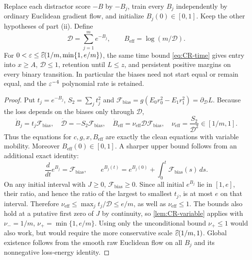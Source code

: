 \begin{corollary}
\label{cor:CR-independent}
Replace each distractor score $-B$ by $-B_j$, train every $B_j$ independently by ordinary Euclidean gradient flow,
and initialize $B_j(0)\in[0,1]$. Keep the other hypotheses of part (ii).
Define
\[
 \mathcal D=\sum_{j=1}^m e^{-B_j},\qquad B_{\mathrm{eff}}=\log(m/\mathcal D).
\]
For $0<\varepsilon\le\widehat{\varepsilon}(1/m,\min\{1,e/m\})$, the same time bound \cref{eq:CR-time} gives
entry into $x\ge A$, $\mathcal D\le1$, retention until $L\le z$, and persistent positive margins on every binary transition.
In particular the biases need not start equal or remain equal, and the $\varepsilon^{-4}$ polynomial rate is retained.
\end{corollary}
\begin{proof}
Put $t_j=e^{-B_j}$, $S_2=\sum_jt_j^2$ and
$\mathcal F_{\mathrm{bias}}=g(E_0r_0^2-E_1r_1^2)=\partial_{\mathcal D} L$.
Because the loss depends on the biases only through $\mathcal D$,
\begin{equation}
 \dot B_j=t_j\mathcal F_{\mathrm{bias}},\quad \dot{\mathcal D}=-S_2\mathcal F_{\mathrm{bias}},\quad
 \dot B_{\mathrm{eff}}=\nu_{\mathrm{eff}}\mathcal D\mathcal F_{\mathrm{bias}},\quad
 \nu_{\mathrm{eff}}=\frac{S_2}{\mathcal D^2}\in[1/m,1].
 \label{eq:CR-independent-flow}
\end{equation}
Thus the equations for $c,g,x,B_{\mathrm{eff}}$ are exactly the clean equations with variable mobility.
Moreover $B_{\mathrm{eff}}(0)\in[0,1]$.
A sharper upper bound follows from an additional exact identity:
\[
 \frac{d}{dt}e^{B_j}=\mathcal F_{\mathrm{bias}},\qquad
 e^{B_j(t)}=e^{B_j(0)}+\int_0^t\mathcal F_{\mathrm{bias}}(s)\,ds.
\]
On any initial interval with $J\ge0$, $\mathcal F_{\mathrm{bias}}\ge0$.
Since all initial $e^{B_j}$ lie in $[1,e]$, their ratio, and hence the ratio of the largest to smallest $t_j$, is at most $e$ on that interval.
Therefore $\nu_{\mathrm{eff}}\le\max_jt_j/\mathcal D\le e/m$, as well as $\nu_{\mathrm{eff}}\le1$.
The bounds also hold at a putative first zero of $J$ by continuity, so \cref{lem:CR-variable} applies with
$\nu_-=1/m$, $\nu_+=\min\{1,e/m\}$.
Using only the unconditional bound $\nu_+\le1$ would also work, but would require the more conservative scale
$\widehat{\varepsilon}(1/m,1)$.
Global existence follows from the smooth raw Euclidean flow on all $B_j$ and its nonnegative loss-energy identity.
\end{proof}

